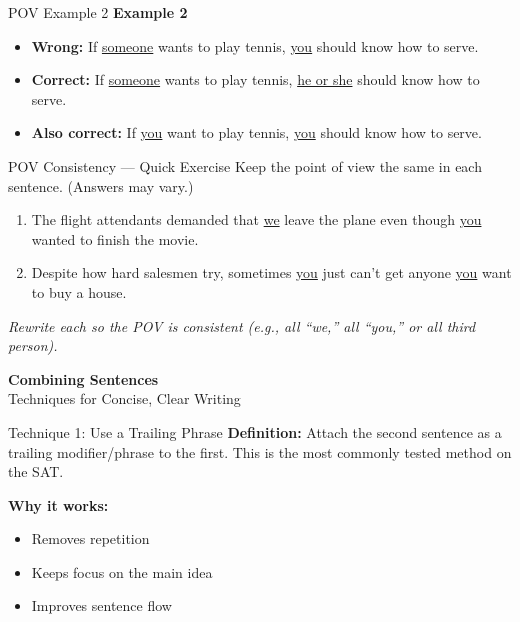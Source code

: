 \documentclass[aspectratio=169,11pt]{beamer}
\begin{document}
\begin{frame}{POV Example 2}
\small
\textbf{Example 2}
\begin{itemize}
  \item \textbf{Wrong:} If \underline{someone} wants to play tennis, \underline{you} should know how to serve.
  \item \textbf{Correct:} If \underline{someone} wants to play tennis, \underline{he or she} should know how to serve.
  \item \textbf{Also correct:} If \underline{you} want to play tennis, \underline{you} should know how to serve.
\end{itemize}
\end{frame}

\begin{frame}{POV Consistency — Quick Exercise}
\small
Keep the point of view the same in each sentence. (Answers may vary.)
\begin{enumerate}
  \item The flight attendants demanded that \underline{we} leave the plane even though \underline{you} wanted to finish the movie.
  \item Despite how hard salesmen try, sometimes \underline{you} just can’t get anyone \underline{you} want to buy a house.
\end{enumerate}
\textit{Rewrite each so the POV is consistent (e.g., all “we,” all “you,” or all third person).}
\end{frame}

\begin{frame}
  \centering
  \Huge \textbf{Combining Sentences} \\[1em]
  \Large Techniques for Concise, Clear Writing
\end{frame}

\begin{frame}{Technique 1: Use a Trailing Phrase}
\small
\textbf{Definition:} Attach the second sentence as a trailing modifier/phrase to the first.  
This is the most commonly tested method on the SAT.  

\textbf{Why it works:}
\begin{itemize}
  \item Removes repetition
  \item Keeps focus on the main idea
  \item Improves sentence flow
\end{itemize}
\end{frame}
\end{document}
